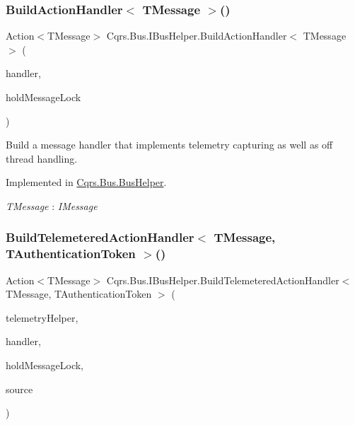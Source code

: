\subsubsection{\texorpdfstring{Build\+Action\+Handler$<$ T\+Message $>$()}{BuildActionHandler< TMessage >()}}
{\footnotesize\ttfamily Action$<$T\+Message$>$ Cqrs.\+Bus.\+I\+Bus\+Helper.\+Build\+Action\+Handler$<$ T\+Message $>$ (\begin{DoxyParamCaption}\item[{Action$<$ T\+Message $>$}]{handler,  }\item[{bool}]{hold\+Message\+Lock }\end{DoxyParamCaption})}



Build a message handler that implements telemetry capturing as well as off thread handling. 



Implemented in \hyperlink{classCqrs_1_1Bus_1_1BusHelper_a6dc1f5166b7bcd13aa7a0d5e25ded295_a6dc1f5166b7bcd13aa7a0d5e25ded295}{Cqrs.\+Bus.\+Bus\+Helper}.

\begin{Desc}
\item[Type Constraints]\begin{description}
\item[{\em T\+Message} : {\em I\+Message}]\end{description}
\end{Desc}
\mbox{\label{interfaceCqrs_1_1Bus_1_1IBusHelper_a29751c186da5e2b042067af6a1be6d5d_a29751c186da5e2b042067af6a1be6d5d}} 
\subsubsection{\texorpdfstring{Build\+Telemetered\+Action\+Handler$<$ T\+Message, T\+Authentication\+Token $>$()}{BuildTelemeteredActionHandler< TMessage, TAuthenticationToken >()}}
{\footnotesize\ttfamily Action$<$T\+Message$>$ Cqrs.\+Bus.\+I\+Bus\+Helper.\+Build\+Telemetered\+Action\+Handler$<$ T\+Message, T\+Authentication\+Token $>$ (\begin{DoxyParamCaption}\item[{I\+Telemetry\+Helper}]{telemetry\+Helper,  }\item[{Action$<$ T\+Message $>$}]{handler,  }\item[{bool}]{hold\+Message\+Lock,  }\item[{string}]{source }\end{DoxyParamCaption})}



